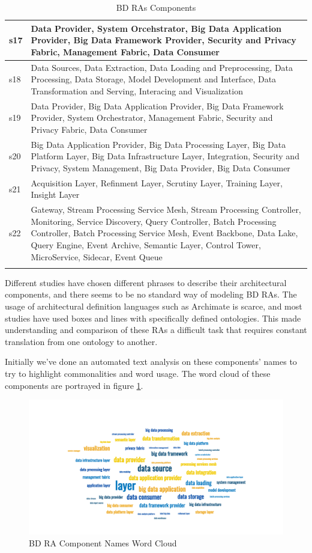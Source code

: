 \documentclass[review]{elsarticle}
\begin{document}
\begin{longtable}{|p{0.5cm}|p{10cm}|}
        \hline
        s17 & Data Provider, System Orcehstrator, Big Data Application Provider, Big Data Framework Provider, Security and Privacy Fabric, Management Fabric, Data Consumer \\
        \hline
        s18 & Data Sources, Data Extraction, Data Loading and Preprocessing, Data Processing, Data Storage, Model Development and Interface, Data Transformation and Serving, Interacing and Visualization \\
        \hline
        s19 & Data Provider, Big Data Application Provider, Big Data Framework Provider, System Orchestrator, Management Fabric, Security and Privacy Fabric, Data Consumer \\
        \hline
        s20 & Big Data Application Provider, Big Data Processing Layer, Big Data Platform Layer, Big Data Infrastructure Layer, Integration, Security and Privacy, System Management, Big Data Provider, Big Data Consumer \\
        \hline
        s21 & Acquisition Layer, Refinment Layer, Scrutiny Layer, Training Layer, Insight Layer \\
        \hline
        s22 & Gateway, Stream Processing Service Mesh, Stream Processing Controller, Monitoring, Service Discovery, Query Controller, Batch Processing Controller, Batch Processing Service Mesh, Event Backbone, Data Lake, Query Engine, Event Archive, Semantic Layer, Control Tower, MicroService, Sidecar, Event Queue  \\
        \hline
        \caption{BD RAs Components}
        \label{Table:BD-RAs-Components}
\end{longtable}

Different studies have chosen different phrases to describe their architectural components, and there seems to be no standard way of modeling BD RAs. The usage of architectural definition languages such as Archimate is scarce, and most studies have used boxes and lines with specifically defined ontologies. This made understanding and comparison of these RAs a difficult task that requires constant translation from one ontology to another. 

Initially we've done an automated text analysis on these components' names to try to highlight commonalities and word usage. The word cloud of these components are portrayed in figure \ref{image:word-cloud}.

\begin{figure}[h]
    \includegraphics[width=12cm]{wordcloud.png}
    \caption{BD RA Component Names Word Cloud}
    \label{image:word-cloud}
\end{figure}
\end{document}
